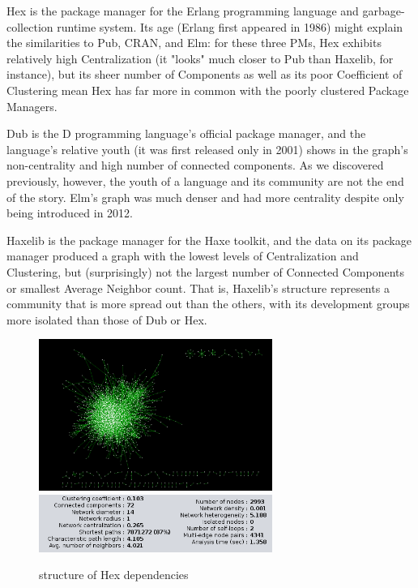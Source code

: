 \documentclass[letterpaper, 10 pt, conference]{ieeeconf}  %
\begin{document}
Hex is the package manager for the Erlang programming language and garbage-collection runtime system.
	Its age (Erlang first appeared in 1986) might explain the similarities to Pub, CRAN, and Elm:
    for these three PMs, Hex exhibits relatively high Centralization (it "looks" much closer to Pub than Haxelib, for instance), 
    but its sheer number of Components as well as its poor Coefficient of Clustering 
    mean Hex has far more in common with the poorly clustered Package Managers.

Dub is the D programming language's official package manager, 
	and the language's relative youth (it was first released only in 2001)
    shows in the graph's non-centrality and high number of connected components.
	As we discovered previously, however, the youth of a language and its community are not the end of the story. 
    Elm's graph was much denser and had more centrality despite only being introduced in 2012. 

Haxelib is the package manager for the Haxe toolkit, 
	and the data on its package manager produced a graph with the lowest levels of Centralization and Clustering, 
    but (surprisingly) not the largest number of Connected Components or smallest Average Neighbor count.
    That is, Haxelib's structure represents a community that is more spread out than the others,
    with its development groups more isolated than those of Dub or Hex.
    
\begin{figure} %
\centering
\includegraphics[width=3in]{images/Hex_Graph.png}
\includegraphics[width=3in]{images/Hex_Params_Screenshot.png}
\caption{\label{Hex_Graph} structure of Hex dependencies}
\end{figure}
\end{document}
